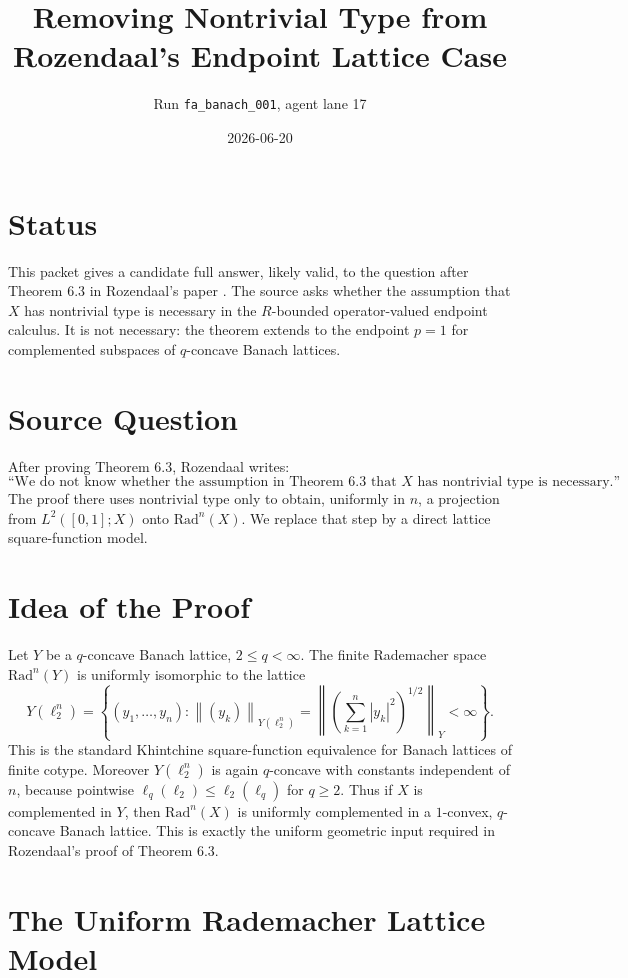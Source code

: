 \documentclass[11pt]{article}
\title{Removing Nontrivial Type from Rozendaal's Endpoint Lattice Case}
\author{Run \texttt{fa\_banach\_001}, agent lane 17}
\date{2026-06-20}
\newcommand{\Rad}{\mathrm{Rad}}
\newcommand{\norm}[1]{\left\|#1\right\|}
\begin{document}
\maketitle

\section*{Status}

This packet gives a candidate full answer, likely valid, to the question after
Theorem 6.3 in Rozendaal's paper \cite{Rozendaal}.  The source asks whether the
assumption that \(X\) has nontrivial type is necessary in the \(R\)-bounded
operator-valued endpoint calculus.  It is not necessary: the theorem extends to
the endpoint \(p=1\) for complemented subspaces of \(q\)-concave Banach lattices.

\section*{Source Question}

After proving Theorem 6.3, Rozendaal writes:
\[
\text{``We do not know whether the assumption in Theorem 6.3 that \(X\) has
nontrivial type is necessary.''}
\]
The proof there uses nontrivial type only to obtain, uniformly in \(n\), a
projection from \(L^2([0,1];X)\) onto \(\Rad^n(X)\).  We replace that step by a
direct lattice square-function model.

\section*{Idea of the Proof}

Let \(Y\) be a \(q\)-concave Banach lattice, \(2\le q<\infty\).  The finite
Rademacher space \(\Rad^n(Y)\) is uniformly isomorphic to the lattice
\[
        Y(\ell_2^n)
        =\left\{(y_1,\ldots,y_n):
          \norm{(y_k)}_{Y(\ell_2^n)}
          =\norm{\left(\sum_{k=1}^n |y_k|^2\right)^{1/2}}_Y<\infty\right\}.
\]
This is the standard Khintchine square-function equivalence for Banach
lattices of finite cotype.  Moreover \(Y(\ell_2^n)\) is again \(q\)-concave
with constants independent of \(n\), because pointwise
\(\ell_q(\ell_2)\le \ell_2(\ell_q)\) for \(q\ge2\).  Thus if \(X\) is
complemented in \(Y\), then \(\Rad^n(X)\) is uniformly complemented in a
\(1\)-convex, \(q\)-concave Banach lattice.  This is exactly the uniform
geometric input required in Rozendaal's proof of Theorem 6.3.

\section*{The Uniform Rademacher Lattice Model}
\end{document}
